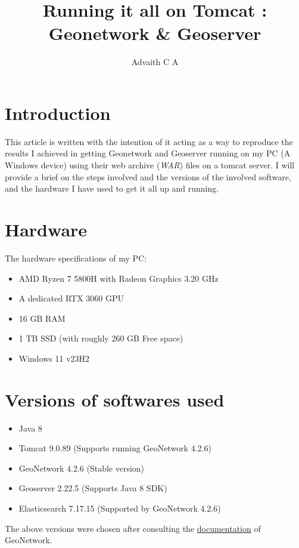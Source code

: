 \documentclass{article}
\title{Running it all on Tomcat : \\ Geonetwork \& Geoserver}
\author{Advaith C A}
\begin{document}
    \maketitle
    \section*{Introduction}
        \hspace{1.5em}This article is written with the intention of it acting as a way to reproduce the results I achieved in getting Geonetwork and Geoserver running on my PC (A Windows device) using their web archive (\textit{WAR}) files on a tomcat server. I will provide a brief on the steps involved and the versions of the involved software, and the hardware I have used to get it all up and running.
    \section*{Hardware}
        \hspace{1.5em}The hardware specifications of my PC:
        \begin{itemize}
            \item AMD Ryzen 7 5800H with Radeon Graphics 3.20 GHz
            \item A dedicated RTX 3060 GPU
            \item 16 GB RAM
            \item 1 TB SSD (with roughly 260 GB Free space)
            \item Windows 11 v23H2
        \end{itemize}
    \section*{Versions of softwares used}
    \begin{itemize}
        \item Java 8
        \item Tomcat 9.0.89 (Supports running GeoNetwork 4.2.6)
        \item GeoNetwork 4.2.6 (Stable version)
        \item Geoserver 2.22.5 (Supports Java 8 SDK)
        \item Elasticsearch 7.17.15 (Supported by GeoNetwork 4.2.6)
    \end{itemize}
        \hspace{1.5em}The above versions were chosen after consulting the \href{https://docs.geonetwork-opensource.org/4.2/install-guide/}{documentation} of GeoNetwork.
\end{document}
